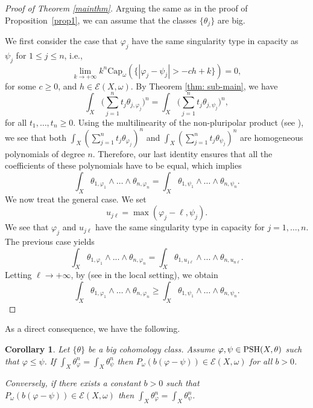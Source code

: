 \documentclass[a4paper]{amsart}
\numberwithin{equation}{section}
\newtheorem{corollary}[theorem]{Corollary}
\theoremstyle{definition}
\numberwithin{equation}{section}
\newcommand{\capK}{\text{Cap}}
\newcommand{\PSH}{{\rm PSH}}
\begin{document}
\begin{proof}[Proof of Theorem \ref{mainthm}]	
 Arguing the same as in the proof of Proposition~\ref{prop1}, we can assume that the classes $\{\theta_j\}$ are big.

 We first consider the case that $\varphi_j$ have the same singularity type in capacity as $\psi_j$ for $1\leq j\leq n$, i.e.,
$$\lim\limits_{ k \to +\infty }k^n \capK_{ \omega } ( \{ |\varphi_j - \psi_j | > -ch + k \} ) = 0,$$
 for some $c\geq 0$, and $ h\in \mathcal E(X,\omega)$. By Theorem \ref{thm: sub-main}, we have
$$\int_{ X }  \Big(\sum\limits_{ j = 1 }^{ n } t_j \theta_{ j, \varphi_j } \Big)^n  = \int_{ X }  \Big( \sum\limits_{ j = 1 }^{ n } t_j \theta_{ j, \psi_j } \Big)^n ,$$
for all $t_1, \ldots, t_n\geq 0$. Using the 
multilinearity of the non-pluripolar product (see \cite[Proposition 1.4]{boucksom2010monge}), we see that both $\int_{ X }  ( \sum_{ j = 1 }^{ n } t_j \theta_{ \varphi_j } )^n $ and $\int_{ X }  (\sum_{ j = 1 }^{ n } t_j \theta_{ \psi_j } )^n $ are homogeneous polynomials of degree $n$. Therefore, our last identity ensures that all the coefficients of these polynomials have to be equal, which implies
$$\int_X  \theta_{ 1, \varphi_1 }\wedge \ldots \wedge \theta_{ n, \varphi_n }  = \int_X  \theta_{ 1, \psi_1 }\wedge \ldots\wedge \theta_{ n, \psi_n }.$$
We now treat the general case. We set
$$u_{j\ell} = \max ( \varphi_j - \ell, \psi_j ).$$
We see that $\varphi_j$ and $u_{j\ell}$ have the same singularity type in capacity for $j=1,\ldots,n$. The previous case yields
$$\int_X  \theta_{ 1, \varphi_1 }\wedge ...\wedge \theta_{ n, \varphi_n } = \int_X  \theta_{ 1, u_{1\ell} } \wedge ...\wedge \theta_{ n, u_{n\ell} }  .$$
Letting $\ell\to +\infty$, by \cite[Theorem 2.3]{darvas2018monotonicity}
  (see \cite[Proposition 2.7]{Hiep10-CV-capacity} in the local setting), we obtain
\[\int_X  \theta_{1, \varphi_1 }\wedge \ldots  \wedge \theta_{ n, \varphi_n } \geq \int_X \theta_{ 1, \psi_1 }\wedge \ldots\wedge \theta_{ n, \psi_n } .\]\end{proof}

As a direct consequence, we have the following.
\begin{corollary}\label{thm: compare-mass} Let $\{\theta\}$ be a big cohomology class.
Assume $\varphi,\psi\in\PSH(X,\theta)$ such that $\varphi\leq \psi$. If $\int_X\theta_\varphi^n=\int_X\theta_\psi^n$ then $P_\omega(b(\varphi-\psi))\in\mathcal E(X,\omega)$ for all $b>0$.
 
		 Conversely,  if there exists a constant $b>0$ such that $P_\omega(b(\varphi-\psi))\in\mathcal E(X,\omega)$ then $\int_X\theta_\varphi^n=\int_X\theta_\psi^n$.	
\end{corollary}
\end{document}
